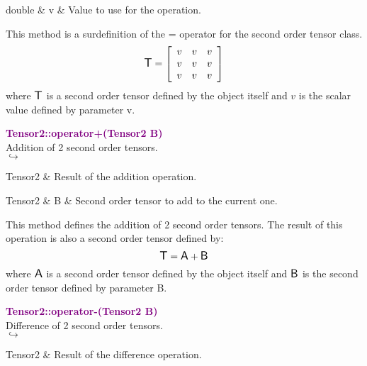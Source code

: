 \begin{tcolorbox}[width=\textwidth,myArgs,tabularx={ll|R}]
double & v & Value to use for the operation.
\end{tcolorbox}

This method is a surdefinition of the = operator for the second order tensor class.
\begin{equation*}
\mbox{\large\ensuremath{\mathsf{T}}}=\left[\begin{array}{ccc}
v & v & v\\
v & v & v\\
v & v & v
\end{array}\right]
\end{equation*}
where $\mbox{\large\ensuremath{\mathsf{T}}}$ is a second order tensor defined by the object itself and $v$ is the scalar value defined by parameter v.

\textcolor{purple}{\textbf{Tensor2::operator+(Tensor2 B)}}\label{Tensor2::operator+(Tensor2 B)}\\
Addition of 2 second order tensors.\\ \hspace*{5mm}$\hookrightarrow$
\vspace*{-2em}\begin{tcolorbox}[grow to left by=-1cm, width=\textwidth-1cm,myArgs,tabularx={l|R}]
Tensor2 & Result of the addition operation.
\end{tcolorbox}

\begin{tcolorbox}[width=\textwidth,myArgs,tabularx={ll|R}]
Tensor2 & B & Second order tensor to add to the current one.
\end{tcolorbox}

This method defines the addition of 2 second order tensors.
The result of this operation is also a second order tensor defined by:
\begin{equation*}
\mbox{\large\ensuremath{\mathsf{T}}} = \mbox{\large\ensuremath{\mathsf{A}}} + \mbox{\large\ensuremath{\mathsf{B}}}
\end{equation*}
where $\mbox{\large\ensuremath{\mathsf{A}}}$ is a second order tensor defined by the object itself and $\mbox{\large\ensuremath{\mathsf{B}}}$ is the second order tensor defined by parameter B.

\textcolor{purple}{\textbf{Tensor2::operator-(Tensor2 B)}}\label{Tensor2::operator-(Tensor2 B)}\\
Difference of 2 second order tensors.\\ \hspace*{5mm}$\hookrightarrow$
\vspace*{-2em}\begin{tcolorbox}[grow to left by=-1cm, width=\textwidth-1cm,myArgs,tabularx={l|R}]
Tensor2 & Result of the difference operation.
\end{tcolorbox}

